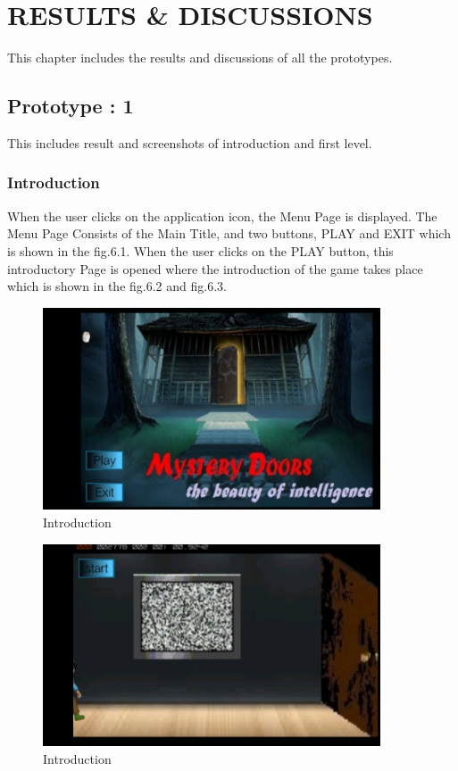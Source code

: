 \chapter{RESULTS \& DISCUSSIONS}
This chapter includes the results and discussions of all the prototypes.

\section{Prototype : 1}
\hspace{1cm} This includes result and screenshots of introduction and first level.

\subsection{Introduction}
\hspace{1cm}When the user clicks on the application icon, the Menu Page is displayed.
The Menu Page Consists of the Main Title, and two buttons, PLAY and EXIT which is shown in the fig.6.1.
When the user clicks on the PLAY button, this introductory Page is opened where 
the introduction of the game takes place which is shown in the fig.6.2 and fig.6.3.
\vspace{1cm}
\begin{figure}[htbp]
	\centering
	\includegraphics[width=10cm,height=6cm]{1.jpg}
	\caption{Introduction}
\end{figure}
\begin{figure}[htbp]
	\centering
	\includegraphics[width=10cm,height=6cm]{2.jpg}
	\caption{Introduction}
\end{figure}
